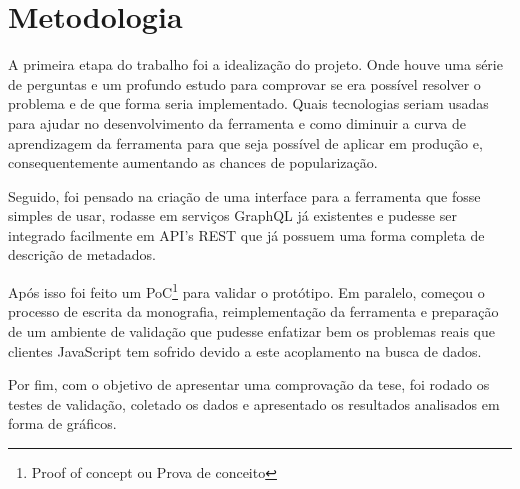 \section[Metodologia]{Metodologia}

A primeira etapa do trabalho foi a idealização do projeto. Onde houve uma série de perguntas e um profundo estudo para comprovar se era possível resolver o problema e de que forma seria implementado. Quais tecnologias seriam usadas para ajudar no desenvolvimento da ferramenta e como diminuir a curva de aprendizagem da ferramenta para que seja possível de aplicar em produção e, consequentemente aumentando as chances de popularização.

Seguido, foi pensado na criação de uma interface para a ferramenta que fosse simples de usar, rodasse em serviços GraphQL já existentes e pudesse ser integrado facilmente em API's REST que já possuem uma forma completa de descrição de metadados.

Após isso foi feito um PoC\footnote{
  Proof of concept ou Prova de conceito
} para validar o protótipo. Em paralelo, começou o processo de escrita da monografia, reimplementação da ferramenta e preparação de um ambiente de validação que pudesse enfatizar bem os problemas reais que clientes JavaScript tem sofrido devido a este acoplamento na busca de dados. 

Por fim, com o objetivo de apresentar uma comprovação da tese, foi rodado os testes de validação, coletado os dados e apresentado os resultados analisados em forma de gráficos.